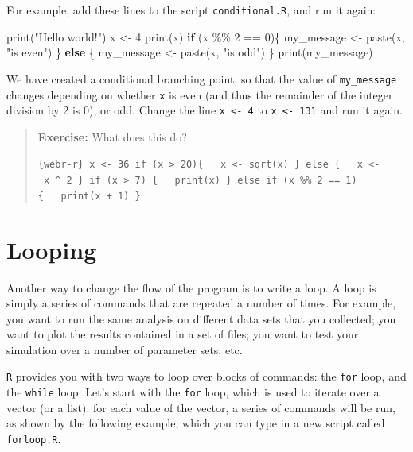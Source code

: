 \documentclass[
  letterpaper,
  DIV=11,
  numbers=noendperiod]{scrreprt}
\newenvironment{Shaded}{\begin{snugshade}}{\end{snugshade}}
\newcommand{\ControlFlowTok}[1]{\textcolor[rgb]{0.00,0.23,0.31}{\textbf{#1}}}
\newcommand{\DecValTok}[1]{\textcolor[rgb]{0.68,0.00,0.00}{#1}}
\newcommand{\FunctionTok}[1]{\textcolor[rgb]{0.28,0.35,0.67}{#1}}
\newcommand{\NormalTok}[1]{\textcolor[rgb]{0.00,0.23,0.31}{#1}}
\newcommand{\OtherTok}[1]{\textcolor[rgb]{0.00,0.23,0.31}{#1}}
\newcommand{\SpecialCharTok}[1]{\textcolor[rgb]{0.37,0.37,0.37}{#1}}
\newcommand{\StringTok}[1]{\textcolor[rgb]{0.13,0.47,0.30}{#1}}
\begin{document}
For example, add these lines to the script \texttt{conditional.R}, and
run it again:

\begin{Shaded}
\begin{Highlighting}[]
\FunctionTok{print}\NormalTok{(}\StringTok{"Hello world!"}\NormalTok{)}
\NormalTok{x }\OtherTok{\textless{}{-}} \DecValTok{4}
\FunctionTok{print}\NormalTok{(x)}
\ControlFlowTok{if}\NormalTok{ (x }\SpecialCharTok{\%\%} \DecValTok{2} \SpecialCharTok{==} \DecValTok{0}\NormalTok{)\{}
\NormalTok{  my\_message }\OtherTok{\textless{}{-}} \FunctionTok{paste}\NormalTok{(x, }\StringTok{"is even"}\NormalTok{)}
\NormalTok{\} }\ControlFlowTok{else}\NormalTok{ \{}
\NormalTok{  my\_message }\OtherTok{\textless{}{-}} \FunctionTok{paste}\NormalTok{(x, }\StringTok{"is odd"}\NormalTok{)}
\NormalTok{\}}
\FunctionTok{print}\NormalTok{(my\_message)}
\end{Highlighting}
\end{Shaded}

We have created a conditional branching point, so that the value of
\texttt{my\_message} changes depending on whether \texttt{x} is even
(and thus the remainder of the integer division by 2 is 0), or odd.
Change the line \texttt{x\ \textless{}-\ 4} to
\texttt{x\ \textless{}-\ 131} and run it again.

\begin{quote}
\textbf{Exercise:} What does this do?

\texttt{\{webr-r\}\ x\ \textless{}-\ 36\ if\ (x\ \textgreater{}\ 20)\{\ \ \ x\ \textless{}-\ sqrt(x)\ \}\ else\ \{\ \ \ x\ \textless{}-\ x\ \^{}\ 2\ \}\ if\ (x\ \textgreater{}\ 7)\ \{\ \ \ print(x)\ \}\ else\ if\ (x\ \%\%\ 2\ ==\ 1)\{\ \ \ print(x\ +\ 1)\ \}}
\end{quote}

\section*{Looping}\label{looping}


Another way to change the flow of the program is to write a loop. A loop
is simply a series of commands that are repeated a number of times. For
example, you want to run the same analysis on different data sets that
you collected; you want to plot the results contained in a set of files;
you want to test your simulation over a number of parameter sets; etc.

\texttt{R} provides you with two ways to loop over blocks of commands:
the \texttt{for} loop, and the \texttt{while} loop. Let's start with the
\texttt{for} loop, which is used to iterate over a vector (or a list):
for each value of the vector, a series of commands will be run, as shown
by the following example, which you can type in a new script called
\texttt{forloop.R}.
\end{document}

